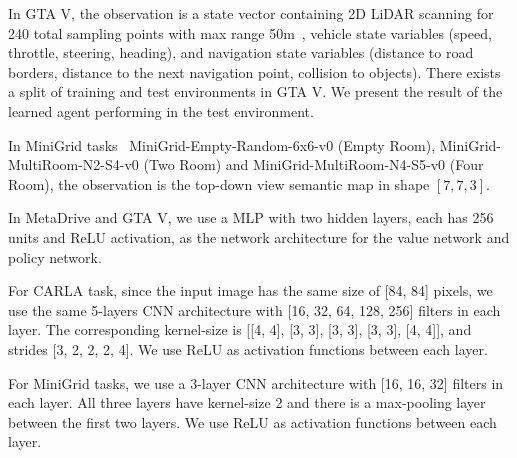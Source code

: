 
In GTA V, the observation is a state vector containing 2D LiDAR scanning for 240 total sampling points with max range 50m~\citep{presil}, vehicle state variables (speed, throttle, steering, heading), and navigation state variables (distance to road borders, distance to the next navigation point, collision to objects). There exists a split of training and test environments in GTA V. We present the result of the learned agent performing in the test environment.

In MiniGrid tasks~\citep{gym_minigrid} MiniGrid-Empty-Random-6x6-v0 (Empty Room), MiniGrid-MultiRoom-N2-S4-v0 (Two Room) and MiniGrid-MultiRoom-N4-S5-v0 (Four Room), the observation is the top-down view semantic map in shape $[7, 7, 3]$.


In MetaDrive and GTA V, we use a MLP with two hidden layers, each has 256 units and ReLU activation, as the network architecture for the value network and policy network.

For CARLA task, since the input image has the same size of [84, 84] pixels,
we use the same 5-layers CNN architecture with [16, 32, 64, 128, 256] filters in each layer. The corresponding kernel-size is [[4, 4], [3, 3], [3, 3], [3, 3], [4, 4]], and strides [3, 2, 2, 2, 4]. We use ReLU as activation functions between each layer.


For MiniGrid tasks, we use a 3-layer CNN architecture with [16, 16, 32] filters in each layer. All three layers have kernel-size 2 and there is a max-pooling layer between the first two layers. We use ReLU as activation functions between each layer.




